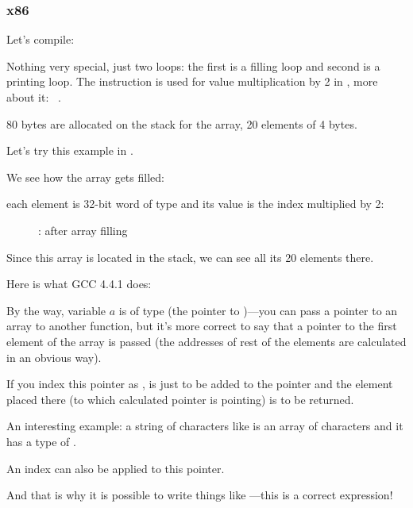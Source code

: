 \subsubsection{x86}


Let's compile:




Nothing very special, just two loops: the first is a filling loop and second is a printing loop.
The  instruction is used for value multiplication by 2 in \ECX, more about it: ~.

80 bytes are allocated on the stack for the array, 20 elements of 4 bytes.

\clearpage
Let's try this example in \olly.
\myindex{\olly}

We see how the array gets filled: 

each element is 32-bit word of \Tint type and its value is the index multiplied by 2:

\begin{figure}[H]
\centering
{}
\caption{\olly: after array filling}
\label{fig:array_simple_olly}
\end{figure}

Since this array is located in the stack, we can see all its 20 elements there.


Here is what GCC 4.4.1 does:



By the way, variable $a$ is of type   
(the pointer to \Tint{})---you can pass a pointer to an array to another function,
but it's more correct to say that a pointer to the first element of the array is passed
(the addresses of rest of the elements are calculated in an obvious way).

If you index this pointer as ,  is just to be added to the pointer 
and the element placed there (to which calculated pointer is pointing) is to be returned.

An interesting example: a string of characters like 
 is an array of characters and it has a type of .

An index can also be applied to this pointer.

And that is why it is possible to write things like ---this is a correct \CCpp expression!

